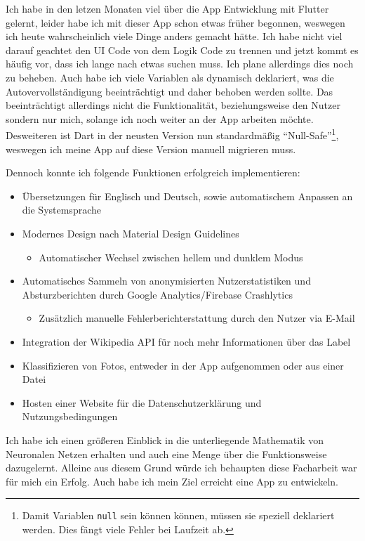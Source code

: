 Ich habe in den letzen Monaten viel über die App Entwicklung mit Flutter gelernt, leider habe ich mit dieser App schon etwas früher begonnen, weswegen ich heute wahrscheinlich viele Dinge anders gemacht hätte. Ich habe nicht viel darauf geachtet den UI Code von dem Logik Code zu trennen und jetzt kommt es häufig vor, dass ich lange nach etwas suchen muss. Ich plane allerdings dies noch zu beheben. Auch habe ich viele Variablen als dynamisch deklariert, was die Autovervollständigung beeinträchtigt und daher behoben werden sollte. Das beeinträchtigt allerdings nicht die Funktionalität, beziehungsweise den Nutzer sondern nur mich, solange ich noch weiter an der App arbeiten möchte. Desweiteren ist Dart in der neusten Version nun standardmäßig "`Null-Safe"'\footnote{Damit Variablen \texttt{null} sein können können, müssen sie speziell deklariert werden. Dies fängt viele Fehler bei Laufzeit ab.}, weswegen ich meine App auf diese Version manuell migrieren muss.

Dennoch konnte ich folgende Funktionen erfolgreich implementieren:

\begin{itemize}
  \item Übersetzungen für Englisch und Deutsch, sowie automatischem Anpassen an die Systemsprache
  \item Modernes Design nach Material Design Guidelines
        \begin{itemize}
          \item Automatischer Wechsel zwischen hellem und dunklem Modus
        \end{itemize}
  \item Automatisches Sammeln von anonymisierten Nutzerstatistiken und Absturzberichten durch Google Analytics/Firebase Crashlytics
        \begin{itemize}
          \item Zusätzlich manuelle Fehlerberichterstattung durch den Nutzer via E-Mail
        \end{itemize}
  \item Integration der Wikipedia API für noch mehr Informationen über das Label
  \item Klassifizieren von Fotos, entweder in der App aufgenommen oder aus einer Datei
  \item Hosten einer Website für die Datenschutzerklärung und Nutzungsbedingungen
\end{itemize}

Ich habe ich einen größeren Einblick in die unterliegende Mathematik von Neuronalen Netzen erhalten und auch eine Menge über die Funktionsweise dazugelernt. Alleine aus diesem Grund würde ich behaupten diese Facharbeit war für mich ein Erfolg. Auch habe ich mein Ziel erreicht eine App zu entwickeln.

